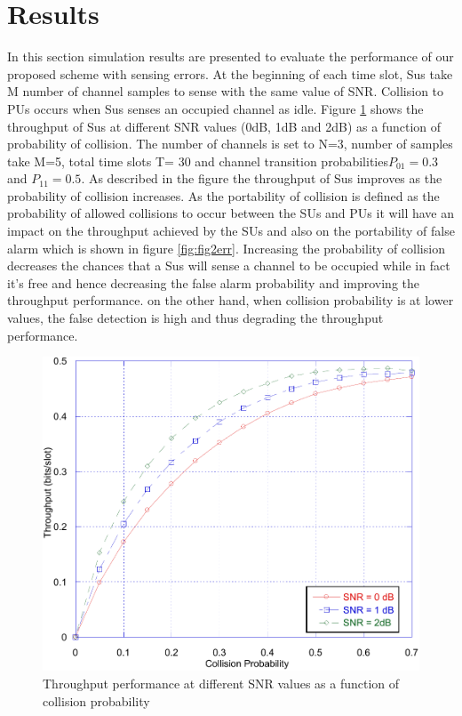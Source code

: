 \documentclass[twocolumn]{el-author}
\begin{document}
	\section{Results}
In this section simulation results are presented to evaluate the performance of our proposed scheme with sensing errors. At the beginning of each time slot, Sus take M number of channel samples to sense with the same value of SNR. Collision to PUs occurs when Sus senses an occupied channel as idle.
Figure \ref{fig:fig1err} shows the throughput of Sus at different SNR values (0dB, 1dB and 2dB) as a function of probability of collision. The number of channels is set to N=3, number of samples take M=5, total time slots T= 30 and channel transition probabilities$ P_ {01} = 0.3 $ and $P_{11}=0.5$. As described in the figure the throughput of Sus improves as the probability of collision increases. As the portability of collision is defined as the probability of allowed collisions to occur between the SUs and PUs it will have an impact on the throughput achieved by the SUs and also on the portability of false alarm which is shown in figure \ref{fig:fig2err}. Increasing the probability of collision decreases the chances that a Sus will sense a channel to be occupied while in fact it's free and hence decreasing the false alarm probability and improving the throughput performance. on the other hand, when collision probability is at lower values, the false detection is high and thus degrading the throughput performance.
\begin{figure}
	\centering
	\includegraphics[width=0.7\linewidth]{./fig1_err}
	\caption{Throughput performance at different SNR values as a function of collision probability}
	\label{fig:fig1err}
\end{figure}
\end{document}
